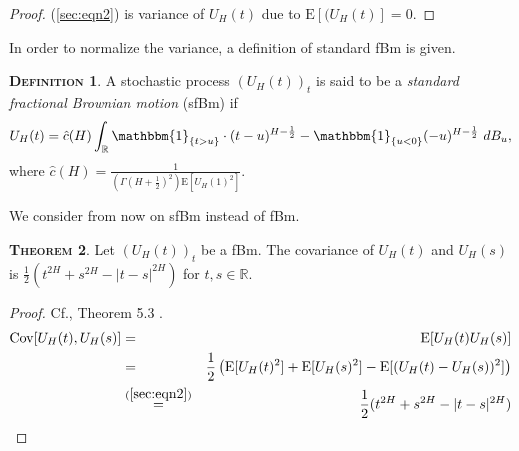 \documentclass[a4paper, twoside, 11pt]{article}
\theoremstyle{definition}
\newtheorem{definition}{\scshape Definition}[section]
\newtheorem{theorem}[definition]{\scshape Theorem}
\newcommand{\brkt}[1]{\left({#1} \right)}
\begin{document}
\begin{proof}
	  (\ref{sec:eqn2}) is variance of $U_H(t)$ due to $\mathrm{E}[(U_H(t)] = 0$.
	\end{proof}
	In order to normalize the variance, a definition of standard fBm is given.

	\begin{definition}
	  A stochastic process $(U_H(t))_{t}$ is said to be a \emph{standard fractional Brownian motion} (sfBm) if
	  \begin{equation}
	U_H(t) = \hat{c}(H) \int_{\mathbb{R}} \mathbbm{1}_{\{t> u\}}\cdot (t-u)^{H-\frac{1}{2}} - \mathbbm{1}_{\{u< 0\}} (-u)^{H-\frac{1}{2}} \, \mathop{dB_u},
	\label{sec:eqn3}
	\end{equation}
	where $\hat{c}(H) = \frac{1}{(\Gamma(H+\frac{1}{2})^2)\mathrm{E}[U_H(1)^2]} $.
	\end{definition}
	We consider from now on sfBm instead of fBm.

	\begin{theorem}
	  Let  $(U_H(t))_{t}$ be a fBm. The covariance of $U_H(t)$ and $U_H(s)$ is $ \frac{1}{2}(t^{2H} + s^{2H} - |t-s|^{2H})$ for $t, s \in \mathbb{R}$.
	\end{theorem}

	\begin{proof}
	  Cf.\cite{mandelbrot}, Theorem 5.3 .
	  \begin{eqnarray}
		\mathrm{Cov}[U_H(t), U_H(s)] &=& \mathrm{E}[U_H(t)U_H(s)] \nonumber\\
		&=& \frac{1}{2}\brkt{\mathrm{E}[U_H(t)^2] + \mathrm{E}[U_H(s)^2] - \mathrm{E}[(U_H(t) - U_H(s))^2]} \nonumber\\
		&\overset{(\ref{sec:eqn2})}{=}& \frac{1}{2}(t^{2H} + s^{2H} - |t-s|^{2H})
		\label{sec:eqn4}
	  \end{eqnarray}
	\end{proof}
\end{document}

